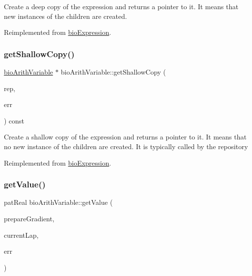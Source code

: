 Create a deep copy of the expression and returns a pointer to it. It means that new instances of the children are created. 

Reimplemented from \hyperlink{classbio_expression_a4ee1b8add634078a02eaae26cd40dcc8}{bio\+Expression}.

\mbox{\label{classbio_arith_variable_a5b2185aabcab07bcd474479f8ca7dd94}} 
\subsubsection{\texorpdfstring{get\+Shallow\+Copy()}{getShallowCopy()}}
{\footnotesize\ttfamily \hyperlink{classbio_arith_variable}{bio\+Arith\+Variable} $\ast$ bio\+Arith\+Variable\+::get\+Shallow\+Copy (\begin{DoxyParamCaption}\item[{\hyperlink{classbio_expression_repository}{bio\+Expression\+Repository} $\ast$}]{rep,  }\item[{pat\+Error $\ast$\&}]{err }\end{DoxyParamCaption}) const\hspace{0.3cm}{\ttfamily [virtual]}}

Create a shallow copy of the expression and returns a pointer to it. It means that no new instance of the children are created. It is typically called by the repository 

Reimplemented from \hyperlink{classbio_expression_a442534762693b92baaf33928979a1bf8}{bio\+Expression}.

\mbox{\label{classbio_arith_variable_a49717d281e84536b65a715918fdfc4c5}} 
\subsubsection{\texorpdfstring{get\+Value()}{getValue()}}
{\footnotesize\ttfamily pat\+Real bio\+Arith\+Variable\+::get\+Value (\begin{DoxyParamCaption}\item[{pat\+Boolean}]{prepare\+Gradient,  }\item[{pat\+U\+Long}]{current\+Lap,  }\item[{pat\+Error $\ast$\&}]{err }\end{DoxyParamCaption})\hspace{0.3cm}{\ttfamily [virtual]}}

